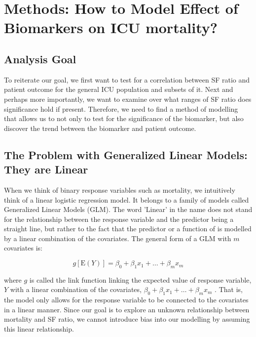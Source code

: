 
\chapter{Methods: How to Model Effect of Biomarkers on ICU mortality?} %

\label{Chapter3} %

\section{Analysis Goal}

To reiterate our goal, we first want to test for a correlation between SF ratio and patient outcome for the general ICU population and subsets of it. Next and perhaps more importantly, we want to examine over what ranges of SF ratio does significance hold if present. Therefore, we need to find a method of modelling that allows us to not only to test for the significance of the biomarker, but also discover the trend between the biomarker and patient outcome. 

\section{The Problem with Generalized Linear Models: They are Linear}

When we think of binary response variables such as mortality, we intuitively think of a linear logistic regression model. It belongs to a family of models called Generalized Linear Models (GLM). The word 'Linear' in the name does not stand for the relationship between the response variable and the predictor being a straight line, but rather to the fact that the predictor or a function of is modelled by a linear combination of the covariates. The general form of a GLM with $m$ covariates is: 

\begin{equation*}
g[\mathrm{E}(Y)]=\beta_{0}+\beta_{1} x_{1}+\ldots+\beta_{m} x_{m}
\end{equation*}

where $g$ is called the link function linking the expected value of response variable, $Y$ with a linear combination of the covariates, $
\beta_{0}+\beta_{1} x_{1}+\ldots+\beta_{m} x_{m}$ \citep{wood2017generalized}. That is, the model only allows for the response variable to be connected to the covariates in a linear manner. Since our goal is to explore an unknown relationship between mortality and SF ratio, we cannot introduce bias into our modelling by assuming this linear relationship. 

